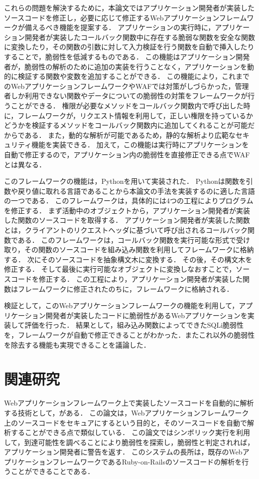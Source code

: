 \documentclass[submit]{ipsj}
\begin{document}
これらの問題を解決するために，本論文ではアプリケーション開発者が実装したソースコードを修正し，必要に応じて修正するWebアプリケーションフレームワークが備えるべき機能を提案する．
アプリケーションの実行時に，アプリケーション開発者が実装したコールバック関数中に存在する脆弱な関数を安全な関数に変換したり，その関数の引数に対して入力検証を行う関数を自動で挿入したりすることで，脆弱性を低減するものである．
この機能はアプリケーション開発者が，脆弱性の解析のために追加の実装を行うことなく，アプリケーションを動的に検証する関数や変数を追加することができる．
この機能により，これまでのWebアプリケーションフレームワークやWAFでは対策がしづらかった，管理者しか利用できない関数やデータについての脆弱性の対策をフレームワークが行うことができる．
権限が必要なメソッドをコールバック関数内で呼び出した時に，フレームワークが，リクエスト情報を利用して，正しい権限を持っているかどうかを検証するメソッドをコールバック関数内に追加してくれることが可能だからである．
また，動的な解析が可能であるため，静的な解析より広範なセキュリティ機能を実装できる．
加えて，この機能は実行時にアプリケーションを自動で修正するので，アプリケーション内の脆弱性を直接修正できる点でWAFとは異なる．

このフレームワークの機能は，Python\cite{py}を用いて実装された．
Pythonは関数を引数や戻り値に取れる言語であることから本論文の手法を実装するのに適した言語の一つである．
このフレームワークは，具体的には4つの工程によりプログラムを修正する．
まず活動中のオブジェクトから，アプリケーション開発者が実装した関数のソースコードを取得する．
アプリケーション開発者が実装した関数とは，クライアントのリクエストヘッダに基づいて呼び出されるコールバック関数である．
このフレームワークは，コールバック関数を実行可能な形式で受け取り，その関数のソースコードを組み込み関数を利用してフレームワークに格納する．
次にそのソースコードを抽象構文木\cite{compiler}に変換する．
その後，その構文木を修正する．
そして最後に実行可能なオブジェクトに変換しなおすことで，ソースコードを修正する．
この工程により，アプリケーション開発者が実装した関数はフレームワークに修正されたのちに，フレームワークに格納される．

検証として，このWebアプリケーションフレームワークの機能を利用して，アプリケーション開発者が実装したコードに脆弱性があるWebアプリケーションを実装して評価を行った．
結果として，組み込み関数によってできたSQLi脆弱性を，フレームワークが自動で修正できることがわかった．またこれ以外の脆弱性を除去する機能も実現できることを議論した．

\section{関連研究}
Webアプリケーションフレームワーク上で実装したソースコードを自動的に解析する技術として，\cite{rubyx}がある．
この論文は，Webアプリケーションフレームワーク上のソースコードをセキュアにするという目的と，そのソースコードを自動で解析することができる点で類似している．
この論文ではシンボリック実行を利用して，到達可能性を調べることにより脆弱性を探索し，脆弱性と判定されれば，アプリケーション開発者に警告を返す．
このシステムの長所は，既存のWebアプリケーションフレームワークであるRuby-on-Rails\cite{rails}のソースコードの解析を行うことができることである．
\end{document}

